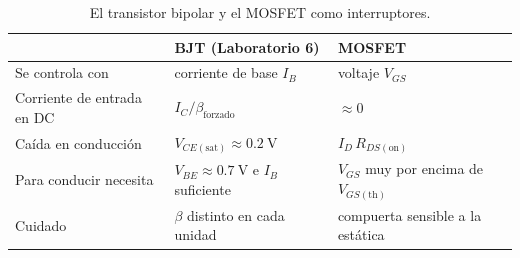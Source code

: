\documentclass[11pt,a4paper]{article}
\begin{document}
\begin{table}[H]
  \centering
  \renewcommand{\arraystretch}{1.3}
  \begin{tabularx}{\linewidth}{|>{\raggedright\arraybackslash}m{3.6cm}|>{\centering\arraybackslash}X|>{\centering\arraybackslash}X|}
    \hline
    & \textbf{BJT (Laboratorio 6)} & \textbf{MOSFET} \\ \hline
    Se controla con & corriente de base $I_B$ & voltaje $V_{GS}$ \\ \hline
    Corriente de entrada en DC & $I_C/\beta_{\text{forzado}}$ & $\approx 0$ \\ \hline
    Caída en conducción & $V_{CE(\text{sat})} \approx \qty{0.2}{\volt}$ & $I_D\,R_{DS(\text{on})}$ \\ \hline
    Para conducir necesita & $V_{BE} \approx \qty{0.7}{\volt}$ e $I_B$ suficiente & $V_{GS}$ muy por encima de $V_{GS(\text{th})}$ \\ \hline
    Cuidado & $\beta$ distinto en cada unidad & compuerta sensible a la estática \\ \hline
  \end{tabularx}
  \caption{El transistor bipolar y el MOSFET como interruptores.}
  \label{tab:bjtmos}
\end{table}

\end{document}
